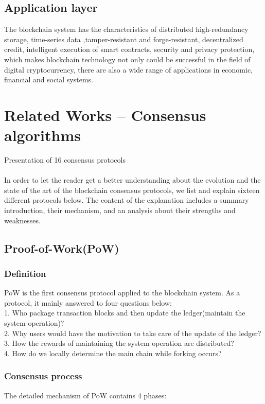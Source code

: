 \documentclass[]{article}
\begin{document}
\begin{CJK*}{UTF8}{gbsn}
\subsection{Application layer}
The blockchain system has the characteristics of distributed high-redundancy storage, time-series data ,tamper-resistant and forge-resistant, decentralized credit, intelligent execution of smart contracts, security and privacy protection, which makes blockchain technology not only could be successful in the field of digital cryptocurrency, there are also a wide range of applications in economic, financial and social systems.

\section{Related Works – Consensus algorithms}
Presentation of 16 consensus protocols
\paragraph{}
	In order to let the reader get a better understanding about the evolution and the state of the art of the blockchain consensus protocols, we list and explain sixteen different protocols below. The content of the explanation includes a summary introduction, their mechanism, and an analysis about their strengths and weaknesses.

	\subsection{Proof-of-Work(PoW)}
    \subsubsection*{Definition}
     PoW is the first consensus protocol applied to the blockchain system. As a protocol, it mainly answered to four questions below: 
    \\1. Who package transaction blocks and then update the ledger(maintain the system operation)?
    \\2. Why users would have the motivation to take care of the update of the ledger?
    \\3. How the rewards of maintaining the system operation are distributed?
    \\4. How do we locally determine the main chain while forking occurs?
    \subsubsection*{Consensus process}
    The detailed mechanism of PoW contains 4 phases:

\end{CJK*}
\end{document}
